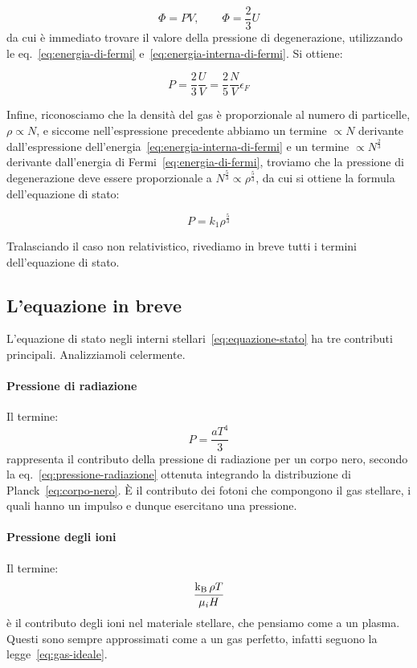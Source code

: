  \[
    \Phi = PV, \qquad \Phi = \frac{2}{3} U
 \]
da cui è immediato trovare il valore della pressione di degenerazione, utilizzando le eq.~\eqref{eq:energia-di-fermi} e~\eqref{eq:energia-interna-di-fermi}. Si ottiene:

\begin{equation}\label{eq:pressione-degenerazione-kennett}
    P = \frac{2}{3} \frac{U}{V} = \frac{2}{5} \frac{N}{V} \epsilon_F
\end{equation}

Infine, riconosciamo che la densità del gas è proporzionale al numero di particelle, $\rho \propto N$, e siccome nell'espressione precedente abbiamo un termine $\propto N$ derivante dall'espressione dell'energia~\eqref{eq:energia-interna-di-fermi} e un termine $\propto N^\frac{2}{3}$ derivante dall'energia di Fermi~\eqref{eq:energia-di-fermi}, troviamo che la pressione di degenerazione deve essere proporzionale a $N^\frac{5}{3} \propto \rho^\frac{5}{3}$, da cui si ottiene la formula dell'equazione di stato:

\[
  P = k_1 \rho^\frac{5}{3}  
\]

Tralasciando il caso non relativistico, rivediamo in breve tutti i termini dell'equazione di stato.

\subsection{L'equazione in breve}
L'equazione di stato negli interni stellari~\eqref{eq:equazione-stato} ha tre contributi principali. Analizziamoli celermente.

\paragraph{Pressione di radiazione}
Il termine:
\[
P = \dfrac{aT^4}{3}
\]
rappresenta il contributo della pressione di radiazione per un corpo nero, secondo la eq.~\eqref{eq:pressione-radiazione} ottenuta integrando la distribuzione di Planck~\ref{eq:corpo-nero}. È il contributo dei fotoni che compongono il gas stellare, i quali hanno un impulso e dunque esercitano una pressione.

\paragraph{Pressione degli ioni}
Il termine:
\[
\dfrac{\operatorname{k_B} \rho T}{\mu_i H}
\]
è il contributo degli ioni nel materiale stellare, che pensiamo come a un plasma. Questi sono sempre approssimati come a un gas perfetto, infatti seguono la legge~\eqref{eq:gas-ideale}.

